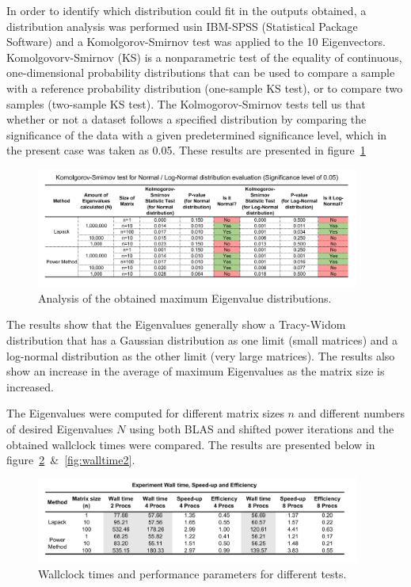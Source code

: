 \documentclass[11pt, oneside]{article}
\begin{document}
        In order to identify which distribution could fit in the outputs obtained, a distribution analysis was performed usin IBM-SPSS (Statistical Package Software) and a Komolgorov-Smirnov test was applied to the 10 Eigenvectors. Komolgovorv-Smirnov (KS) is a nonparametric test of the equality of continuous, one-dimensional probability distributions that can be used to compare a sample with a reference probability distribution (one-sample KS test), or to compare two samples (two-sample KS test). The Kolmogorov-Smirnov tests tell us that whether or not a dataset follows a specified distribution by comparing the significance of the data with a given predetermined significance level, which in the present case was taken as 0.05. These results are presented in figure~\ref{fig:3}
        \begin{figure}[h]
		\centering
		\includegraphics[width=0.95\textwidth]{Figures/tab_test.png}
		\caption{Analysis of the obtained maximum Eigenvalue distributions.}
		\label{fig:3}
	\end{figure}
The results show that the Eigenvalues generally show a Tracy-Widom distribution that has a Gaussian distribution as one limit (small matrices) and a log-normal distribution as the other limit (very large matrices). The results also show an increase in the average of maximum Eigenvalues as the matrix size is increased.        

The Eigenvalues were computed for different matrix sizes $n$ and different numbers of desired Eigenvalues $N$ using both BLAS and shifted power iterations and the obtained wallclock times were compared. The results are presented below in  figure~\ref{fig:walltime}~\&~\ref{fig:walltime2}.
        	\begin{figure}[h]
		\centering
		\includegraphics[width=0.95\textwidth]{Figures/eff.png}
		\caption{Wallclock times and performance parameters for different tests.}
		\label{fig:walltime}
	        \end{figure}
\end{document}

